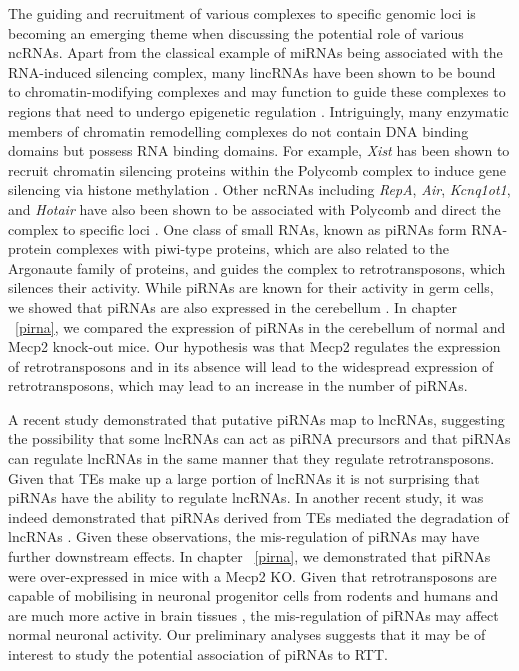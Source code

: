 The guiding and recruitment of various complexes to specific genomic loci is becoming an emerging theme when discussing the potential role of various ncRNAs. Apart from the classical example of miRNAs being associated with the RNA-induced silencing complex, many lincRNAs have been shown to be bound to chromatin-modifying complexes and may function to guide these complexes to regions that need to undergo epigenetic regulation \citep{pmid21915889,pmid19571010}. Intriguingly, many enzymatic members of chromatin remodelling complexes do not contain DNA binding domains but possess RNA binding domains. For example, \textit{Xist} has been shown to recruit chromatin silencing proteins within the Polycomb complex to induce gene silencing via histone methylation \citep{pmid17869504}. Other ncRNAs including \textit{RepA}, \textit{Air}, \textit{Kcnq1ot1}, and \textit{Hotair} have also been shown to be associated with Polycomb and direct the complex to specific loci \citep{pmid21915889}. One class of small RNAs, known as piRNAs form RNA-protein complexes with piwi-type proteins, which are also related to the Argonaute family of proteins, and guides the complex to retrotransposons, which silences their activity. While piRNAs are known for their activity in germ cells, we showed that piRNAs are also expressed in the cerebellum \citep{saxena2012pirnas}. In chapter ~\ref{pirna}, we compared the expression of piRNAs in the cerebellum of normal and Mecp2 knock-out mice. Our hypothesis was that Mecp2 regulates the expression of retrotransposons \citep{pmid21085180} and in its absence will lead to the widespread expression of retrotransposons, which may lead to an increase in the number of piRNAs.

A recent study demonstrated that putative piRNAs map to lncRNAs, suggesting the possibility that some lncRNAs can act as piRNA precursors \citep{pmid24981367} and that piRNAs can regulate lncRNAs in the same manner that they regulate retrotransposons. Given that TEs make up a large portion of lncRNAs \citep{pmid23637635} it is not surprising that piRNAs have the ability to regulate lncRNAs. In another recent study, it was indeed demonstrated that piRNAs derived from TEs mediated the degradation of lncRNAs \citep{Watanabe05122014}. Given these observations, the mis-regulation of piRNAs may have further downstream effects. In chapter ~\ref{pirna}, we demonstrated that piRNAs were over-expressed in mice with a Mecp2 KO. Given that retrotransposons are capable of mobilising in neuronal progenitor cells from rodents \citep{pmid15959507} and humans \citep{pmid19657334} and are much more active in brain tissues \citep{pmid22037309}, the mis-regulation of piRNAs may affect normal neuronal activity. Our preliminary analyses suggests that it may be of interest to study the potential association of piRNAs to RTT.

